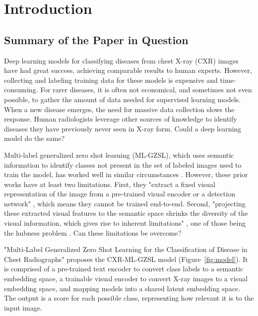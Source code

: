 \documentclass[letterpaper]{article} %
\begin{document}
\section{Introduction}

\subsection{Summary of the Paper in Question}

Deep learning models for classifying diseases from chest X-ray (CXR) images have had great success, achieving comparable results to human experts. However, collecting and labeling training data for these models is expensive and time-consuming. For rarer diseases, it is often not economical, and sometimes not even possible, to gather the amount of data needed for supervised learning models. When a new disease emerges, the need for massive data collection slows the response. Human radiologists leverage other sources of knowledge to identify diseases they have previously never seen in X-ray form. Could a deep learning model do the same?

Multi-label generalized zero shot learning (ML-GZSL), which uses semantic information to identify classes not present in the set of labeled images used to train the model, has worked well in similar circumstances \cite{10.1109/TPAMI.2012.256, 10.1109/TMM.2019.2924511, 9157745}. However, these prior works have at least two limitations. First, they "extract a fixed visual representation of the image from a pre-trained visual encoder or a detection network" \cite{hayat2021multilabel}, which means they cannot be trained end-to-end. Second, "projecting these extracted visual features to the semantic space shrinks the diversity of the visual information, which gives rise to inherent limitations" \cite{hayat2021multilabel}, one of those being the hubness problem \cite{dinu2015improvingzeroshotlearningmitigating}. Can these limitations be overcome?

"Multi-Label Generalized Zero Shot Learning for the Classification of Disease in Chest Radiographs" \cite{hayat2021multilabel} proposes the CXR-ML-GZSL model (Figure~\ref{fig:model}). It is comprised of a pre-trained text encoder to convert class labels to a semantic embedding space, a trainable visual encoder to convert X-ray images to a visual embedding space, and mapping models into a shared latent embedding space. The output is a score for each possible class, representing how relevant it is to the input image.
\end{document}
